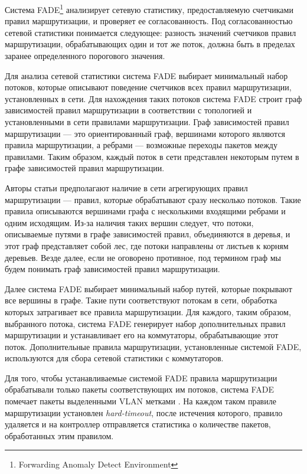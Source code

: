 \documentclass[../thesis.tex]{subfiles}
\begin{document}
Система FADE\footnote{Forwarding Anomaly Detect Environment} \cite{pang2016fade} анализирует сетевую статистику, предоставляемую счетчиками правил маршрутизации, и проверяет ее согласованность.
Под согласованностью сетевой статистики понимается следующее: разность значений счетчиков правил маршрутизации, обрабатывающих один и тот же поток, должна быть в пределах заранее определенного порогового значения.

Для анализа сетевой статистики система FADE выбирает минимальный набор потоков, которые описывают поведение счетчиков всех правил маршрутизации, установленных в сети.
Для нахождения таких потоков система FADE строит граф зависимостей правил маршрутизации в соответствии с топологией и установленными в сети правилами маршрутизации.
Граф зависимостей правил маршрутизации --- это ориентированный граф, вершинами которого являются правила маршрутизации, а ребрами --- возможные переходы пакетов между правилами.
Таким образом, каждый поток в сети представлен некоторым путем в графе зависимостей правил маршрутизации.

Авторы статьи \cite{pang2016fade} предполагают наличие в сети агрегирующих правил маршрутизации --- правил, которые обрабатывают сразу несколько потоков.
Такие правила описываются вершинами графа с несколькими входящими ребрами и одним исходящим.
Из-за наличия таких вершин следует, что потоки, описываемые путями в графе зависимостей правил, объединяются в деревья, и этот граф представляет собой лес, где потоки направлены от листьев к корням деревьев.
Везде далее, если не оговорено противное, под термином граф мы будем понимать граф зависимостей правил маршрутизации.

Далее система FADE выбирает минимальный набор путей, которые покрывают все вершины в графе.
Такие пути соответствуют потокам в сети, обработка которых затрагивает все правила маршрутизации.
Для каждого, таким образом, выбранного потока, система FADE генерирует набор дополнительных правил маршрутизации и устанавливает его на коммутаторы, обрабатывающие этот поток.
Дополнительные правила маршрутизации, установленные системой FADE, используются для сбора сетевой статистики с коммутаторов.

Для того, чтобы устанавливаемые системой FADE правила маршрутизации обрабатывали только пакеты соответствующих им потоков, система FADE помечает пакеты выделенными VLAN метками \cite{thaler2013ieee}.
На каждом таком правиле маршрутизации установлен \textit{hard-timeout}, после истечения которого, правило удаляется и на контроллер отправляется статистика о количестве пакетов, обработанных этим правилом.
\end{document}
